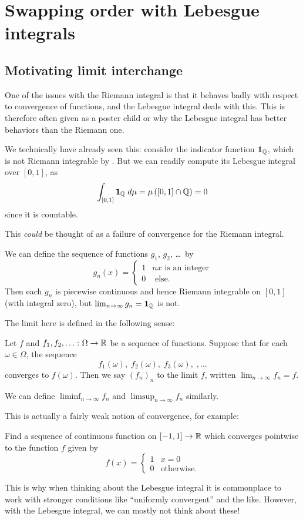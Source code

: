 \chapter{Swapping order with Lebesgue integrals}
\section{Motivating limit interchange}

One of the issues with the Riemann integral is
that it behaves badly with respect to convergence of functions,
and the Lebesgue integral deals with this.
This is therefore often given as a poster child
or why the Lebesgue integral has better behaviors than the Riemann one.

We technically have already seen this:
consider the indicator function $\mathbf{1}_\mathbb Q$,
which is not Riemann integrable by .
But we can readily compute its Lebesgue integral over $[0,1]$, as
\[ \int_{[0,1]} \mathbf{1}_\mathbb Q \; d\mu
	= \mu\left( [0,1] \cap \mathbb Q \right) = 0 \]
since it is countable.

This \emph{could} be thought of as a failure of convergence
for the Riemann integral.
\begin{example}
	\label{ex:1QQindicator}
	We can define the sequence of functions $g_1$, $g_2$, \dots\ by
	\[ g_n(x) = \begin{cases}
			1 & nx \text{ is an integer} \\
			0 & \text{ else}.
		\end{cases} \]
	Then each $g_n$ is piecewise continuous
	and hence Riemann integrable on $[0,1]$ (with integral zero),
	but $\lim_{n \to \infty} g_n = \mathbf{1}_\mathbb Q$ is not.
\end{example}

The limit here is defined in the following sense:
\begin{definition}
	Let $f$ and $f_1, f_2, \dots \colon \Omega \to \mathbb R$ be a sequence of functions.
	Suppose that for each $\omega \in \Omega$, the sequence
	\[ f_1(\omega), \; f_2(\omega), \; f_3(\omega), \;, \dots \]
	converges to $f(\omega)$.
	Then we say $(f_n)_n$ 
	to the limit $f$, written $\lim_{n \to \infty} f_n = f$.

	We can define $\liminf_{n \to \infty} f_n$
	and $\limsup_{n \to \infty} f_n$ similarly.
\end{definition}
This is actually a fairly weak notion of convergence, for example:
\begin{exercise}
	Find a sequence of continuous function on $[-1,1] \to \mathbb R$
	which converges pointwise to the function $f$ given by
	\[ f(x) = \begin{cases}
			1 & x = 0 \\
			0 & \text{otherwise}.
		\end{cases} \]
\end{exercise}
This is why when thinking about the Lebesgue integral
it is commonplace to work with stronger conditions like
``uniformly convergent'' and the like.
However, with the Lebesgue integral, we can mostly not think about these!

